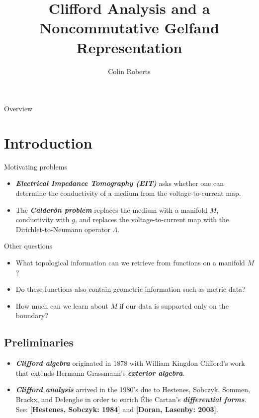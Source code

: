 \documentclass[aspectratio=169]{beamer}
\author{Colin Roberts}
\title{Clifford Analysis and a Noncommutative Gelfand Representation}
\subtitle{}
\newcommand\boldgreen[1]{\textcolor{lighter_csu_green}{\emph{\textbf{#1}}}}
\newcommand\boldgold[1]{\textcolor{csu_gold}{\textbf{#1}}}
\begin{document}
\begin{frame}{Overview}
\tableofcontents
\end{frame}

\section{Introduction}

\begin{frame}{Motivating problems}
\vfill
\begin{itemize}
\pause
\item \boldgreen{Electrical Impedance Tomography (EIT)} asks whether one can determine the conductivity of a medium from the voltage-to-current map.
\pause
\item The \boldgreen{Calder\'on problem} replaces the medium with a manifold $M$, conductivity with $g$, and replaces the voltage-to-current map with the Dirichlet-to-Neumann operator $\Lambda$.
\end{itemize}
\vfill
\end{frame}

\begin{frame}{Other questions}
\vfill 
    \begin{itemize}
        \pause 
        \item What topological information can we retrieve from functions on a manifold $M$?

        \pause
        \item Do these functions also contain geometric information such as metric data?

        \pause
        \item How much can we learn about $M$ if our data is supported only on the boundary?
    \end{itemize}
\vfill
\end{frame}

\subsection{Preliminaries}

\begin{frame}{}
\vfill
\begin{itemize}
    \pause
    \item \boldgreen{Clifford algebra} originated in 1878 with William Kingdon Clifford's work that extends Hermann Grassmann's \boldgreen{exterior algebra}. 
    \pause
    \item \boldgreen{Clifford analysis} arrived in the 1980's due to Hestenes, Sobczyk, Sommen, Brackx, and Delenghe in order to enrich \'Elie Cartan's \boldgreen{differential forms}. See: \boldgold{[Hestenes, Sobczyk: 1984]} and \boldgold{[Doran, Lasenby: 2003]}.
\end{itemize}
\vfill
\end{frame}
\end{document}
